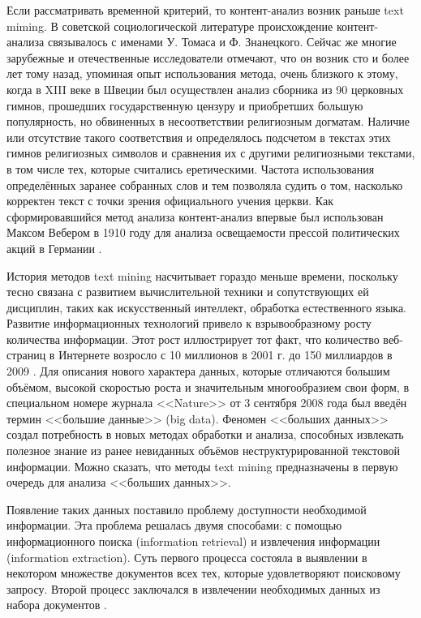 Если рассматривать временной критерий, то контент-анализ возник раньше text miming. В советской социологической литературе происхождение контент-анализа связывалось с именами У. Томаса и Ф. Знанецкого. Сейчас же многие зарубежные\cite{Smith2000} и отечественные\cite{Pochepcov1998} исследователи отмечают, что он возник сто и более лет тому назад, упоминая опыт использования метода, очень близкого к этому, когда в XIII веке в Швеции был осуществлен анализ сборника из 90 церковных гимнов, прошедших государственную цензуру и приобретших большую популярность, но обвиненных в несоответствии религиозным догматам. Наличие или отсутствие такого соответствия и определялось подсчетом в текстах этих гимнов религиозных символов и сравнения их с другими религиозными текстами, в том числе тех, которые считались еретическими. Частота использования определённых заранее собранных слов и тем позволяла судить о том, насколько корректен текст с точки зрения официального учения церкви. Как сформировавшийся метод анализа контент-анализ впервые был использован Максом Вебером в 1910 году для анализа освещаемости прессой политических акций в Германии \cite[стр. 155]{Lande2006}.

История методов text mining насчитывает гораздо меньше времени, поскольку тесно связана с развитием вычислительной техники и сопутствующих ей дисциплин, таких как искусственный интеллект, обработка естественного языка. Развитие информационных технологий привело к взрывообразному росту количества информации. Этот рост иллюстрирует тот факт, что количество веб-страниц в Интернете возросло с 10 миллионов в 2001 г. до 150 миллиардов в 2009 \cite[стр. 4]{practical_tm}. Для описания нового характера данных, которые отличаются большим объёмом, высокой скоростью роста и значительным многообразием свои форм, в специальном номере журнала <<Nature>> от 3 сентября 2008 года был введён термин <<большие данные>> (big data). Феномен <<больших данных>> создал потребность в новых методах обработки и анализа, способных извлекать полезное знание из ранее невиданных объёмов неструктурированной текстовой информации. Можно сказать, что методы text mining предназначены в первую очередь для анализа <<больших данных>>.

Появление таких данных поставило проблему доступности необходимой информации. Эта проблема решалась двумя способами: с помощью информационного поиска (information retrieval) и извлечения информации (information extraction). Суть первого процесса состояла в выявлении в некотором множестве документов всех тех, которые удовлетворяют поисковому запросу. Второй процесс заключался в извлечении необходимых данных из набора документов \cite[стр. 5]{practical_tm}.

